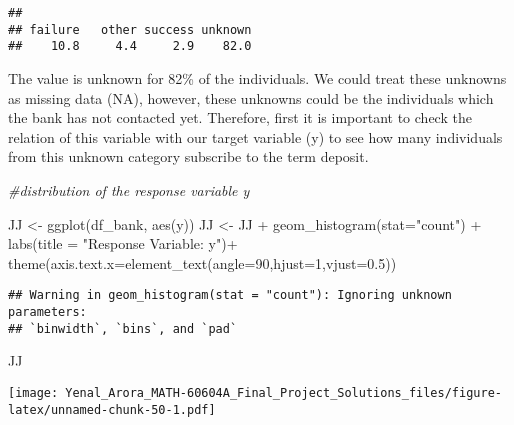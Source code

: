 \documentclass[
]{article}
\newenvironment{Shaded}{\begin{snugshade}}{\end{snugshade}}
\newcommand{\AttributeTok}[1]{\textcolor[rgb]{0.77,0.63,0.00}{#1}}
\newcommand{\CommentTok}[1]{\textcolor[rgb]{0.56,0.35,0.01}{\textit{#1}}}
\newcommand{\DecValTok}[1]{\textcolor[rgb]{0.00,0.00,0.81}{#1}}
\newcommand{\FloatTok}[1]{\textcolor[rgb]{0.00,0.00,0.81}{#1}}
\newcommand{\FunctionTok}[1]{\textcolor[rgb]{0.00,0.00,0.00}{#1}}
\newcommand{\NormalTok}[1]{#1}
\newcommand{\OtherTok}[1]{\textcolor[rgb]{0.56,0.35,0.01}{#1}}
\newcommand{\SpecialCharTok}[1]{\textcolor[rgb]{0.00,0.00,0.00}{#1}}
\newcommand{\StringTok}[1]{\textcolor[rgb]{0.31,0.60,0.02}{#1}}
\begin{document}
\begin{verbatim}
## 
## failure   other success unknown 
##    10.8     4.4     2.9    82.0
\end{verbatim}

The value is unknown for 82\% of the individuals. We could treat these
unknowns as missing data (NA), however, these unknowns could be the
individuals which the bank has not contacted yet. Therefore, first it is
important to check the relation of this variable with our target
variable (y) to see how many individuals from this unknown category
subscribe to the term deposit.

\begin{Shaded}
\begin{Highlighting}[]
\CommentTok{\#distribution of the response variable y}

\NormalTok{JJ }\OtherTok{\textless{}{-}} \FunctionTok{ggplot}\NormalTok{(df\_bank, }\FunctionTok{aes}\NormalTok{(y))}
\NormalTok{JJ }\OtherTok{\textless{}{-}}\NormalTok{ JJ }\SpecialCharTok{+} \FunctionTok{geom\_histogram}\NormalTok{(}\AttributeTok{stat=}\StringTok{"count"}\NormalTok{) }\SpecialCharTok{+} \FunctionTok{labs}\NormalTok{(}\AttributeTok{title =} \StringTok{"Response Variable: y"}\NormalTok{)}\SpecialCharTok{+}
  \FunctionTok{theme}\NormalTok{(}\AttributeTok{axis.text.x=}\FunctionTok{element\_text}\NormalTok{(}\AttributeTok{angle=}\DecValTok{90}\NormalTok{,}\AttributeTok{hjust=}\DecValTok{1}\NormalTok{,}\AttributeTok{vjust=}\FloatTok{0.5}\NormalTok{))}
\end{Highlighting}
\end{Shaded}

\begin{verbatim}
## Warning in geom_histogram(stat = "count"): Ignoring unknown parameters:
## `binwidth`, `bins`, and `pad`
\end{verbatim}

\begin{Shaded}
\begin{Highlighting}[]
\NormalTok{JJ}
\end{Highlighting}
\end{Shaded}

\texttt{[image: Yenal\_Arora\_MATH-60604A\_Final\_Project\_Solutions\_files/figure-latex/unnamed-chunk-50-1.pdf]}

\begin{Shaded}
\end{Shaded}
\end{document}
